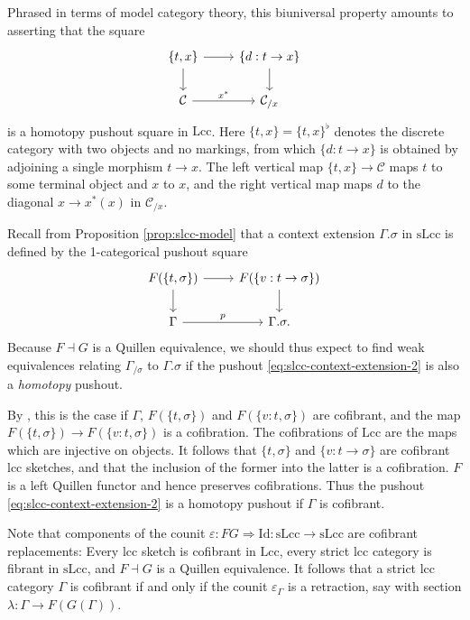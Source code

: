 \documentclass[a4paper]{article}
\theoremstyle{remark}
\theoremstyle{definition}
\begin{document}
Phrased in terms of model category theory, this biuniversal property amounts to asserting that the square
\begin{equation}
  \label{eq:homotopy-pushout-lcc}
  \begin{tikzcd}
    \{ t, x \} \arrow[r] \arrow[d] & \{ d : t \rightarrow x \} \arrow[d] \\
    \mathcal{C} \arrow[r, "x^*"] & \mathcal{C}_{/ x}
  \end{tikzcd}
\end{equation}
is a homotopy pushout square in $\mathrm{Lcc}$.
Here $\{t, x\} = \{t, x\}^\flat$ denotes the discrete category with two objects and no markings, from which $\{d : t \rightarrow x\}$ is obtained by adjoining a single morphism $t \rightarrow x$.
The left vertical map $\{ t, x \} \rightarrow \mathcal{C}$ maps $t$ to some terminal object and $x$ to $x$, and the right vertical map maps $d$ to the diagonal $x \rightarrow x^*(x)$ in $\mathcal{C}_{/ x}$.

Recall from Proposition \ref{prop:slcc-model} that a context extension $\Gamma.\sigma$ in $\mathrm{sLcc}$ is defined by the 1-categorical pushout square
\begin{equation}
  \label{eq:slcc-context-extension-2}
  \begin{tikzcd}
    F(\{ t, \sigma \}) \arrow[d] \arrow[r] & F(\{ v : t \rightarrow \sigma \}) \arrow[d] \\
    \Gamma \arrow[r, "p"] & \Gamma.\sigma.
  \end{tikzcd}
\end{equation}
Because $F \dashv G$ is a Quillen equivalence, we should thus expect to find weak equivalences relating $\Gamma_{/ \sigma}$ to $\Gamma.\sigma$ if the pushout \eqref{eq:slcc-context-extension-2} is also a \emph{homotopy} pushout.

By \citet[Proposition A.2.4.4]{higher-topos-theory}, this is the case if $\Gamma$, $F(\{t, \sigma\})$ and $F(\{v : t, \sigma\})$ are cofibrant, and the map $F(\{t, \sigma\}) \rightarrow F(\{v : t, \sigma\})$ is a cofibration.
The cofibrations of $\mathrm{Lcc}$ are the maps which are injective on objects.
It follows that $\{t, \sigma\}$ and $\{ v : t \rightarrow \sigma\}$ are cofibrant lcc sketches, and that the inclusion of the former into the latter is a cofibration.
$F$ is a left Quillen functor and hence preserves cofibrations.
Thus the pushout \eqref{eq:slcc-context-extension-2} is a homotopy pushout if $\Gamma$ is cofibrant.

Note that components of the counit $\varepsilon : FG \Rightarrow \mathrm{Id} : \mathrm{sLcc} \rightarrow \mathrm{sLcc}$ are cofibrant replacements:
Every lcc sketch is cofibrant in $\mathrm{Lcc}$, every strict lcc category is fibrant in $\mathrm{sLcc}$, and $F \dashv G$ is a Quillen equivalence.
It follows that a strict lcc category $\Gamma$ is cofibrant if and only if the counit $\varepsilon_\Gamma$ is a retraction, say with section $\lambda : \Gamma \rightarrow F(G(\Gamma))$.
\end{document}
